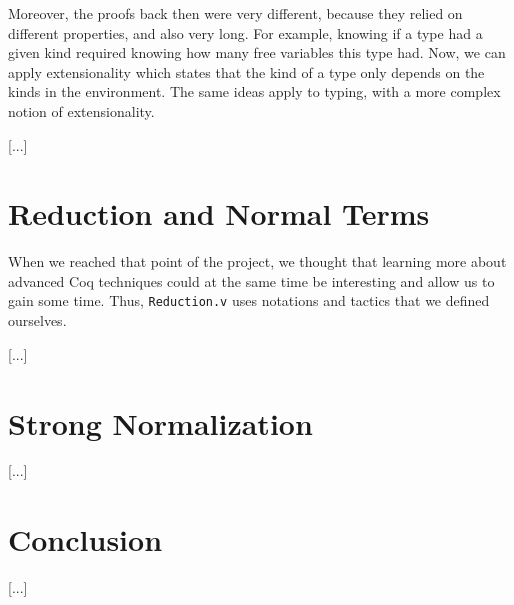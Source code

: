 \documentclass[a4paper,11pt]{article}
\begin{document}
Moreover, the proofs back then were very different, because they
relied on different properties, and also very long. For example,
knowing if a type had a given kind required knowing how many free
variables this type had. Now, we can apply extensionality which
states that the kind of a type only depends on the kinds in the
environment. The same ideas apply to typing, with a more complex
notion of extensionality.

[...]

\section{Reduction and Normal Terms}

When we reached that point of the project, we thought that learning
more about advanced Coq techniques could at the same time be
interesting and allow us to gain some time. Thus, \verb|Reduction.v|
uses notations and tactics that we defined ourselves.

[...]

\section{Strong Normalization}

[...]

\section*{Conclusion}

[...]
\end{document}
